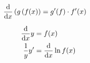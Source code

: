 \begin{boxleft}
\end{boxleft}\begin{boxrightshaded}
 \begin{align} 
\frac{\mathop{}\!\mathrm{d} }{\mathop{}\!\mathrm{d} x}\left(g\left( f(x\right)\right)&=g'(f)\cdot f'(x)
 \end{align}\end{boxrightshaded}
                 
\begin{boxleft}
\end{boxleft}\begin{boxrightshaded}
 \begin{align} 
\frac{\mathop{}\!\mathrm{d} }{\mathop{}\!\mathrm{d} x}y&=f(x)\\
\frac{1}{y}y'&=\frac{\mathop{}\!\mathrm{d} }{\mathop{}\!\mathrm{d} x}\ln{f(x)}
 \end{align}\end{boxrightshaded}
                   
